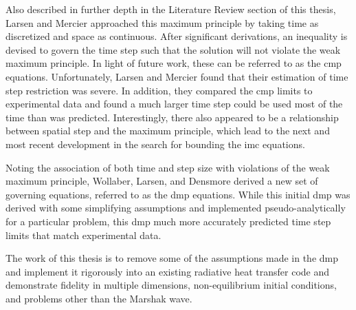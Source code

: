 Also described in further depth in the Literature Review section of this thesis, Larsen and Mercier approached this maximum principle by taking time as discretized and space as continuous.  After significant derivations, an inequality is devised to govern the time step such that the solution will not violate the weak maximum principle.  In light of future work, these can be referred to as the \gls{cmp} equations.  Unfortunately, Larsen and Mercier found that their estimation of time step restriction was severe.  In addition, they compared the \gls{cmp} limits to experimental data and found a much larger time step could be used most of the time than was predicted.  Interestingly, there also appeared to be a relationship between spatial step and the maximum principle, which lead to the next and most recent development in the search for bounding the \gls{imc} equations.

Noting the association of both time and step size with violations of the weak maximum principle, Wollaber, Larsen, and Densmore derived a new set of governing equations, referred to as the \gls{dmp} equations.  While this initial \gls{dmp} was derived with some simplifying assumptions and implemented pseudo-analytically for a particular problem, this \gls{dmp} much more accurately predicted time step limits that match experimental data.

The work of this thesis is to remove some of the assumptions made in the \gls{dmp} and implement it rigorously into an existing radiative heat transfer code and demonstrate fidelity in multiple dimensions, non-equilibrium initial conditions, and problems other than the Marshak wave.